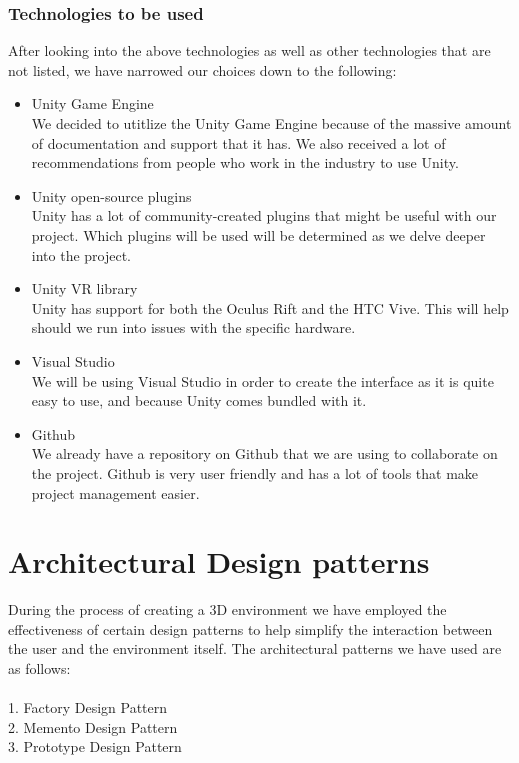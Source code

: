 \documentclass{article}
\begin{document}
	\subsubsection{Technologies to be used}
		After looking into the above technologies as well as other technologies that are not listed, we have narrowed our choices down to the following:
		\begin{itemize}
			\item Unity Game Engine \\
			We decided to utitlize the Unity Game Engine because of the massive amount of documentation and support that it has. We also received a lot of recommendations from people who work in the industry to use Unity.\\

			\item Unity open-source plugins \\
			Unity has a lot of community-created plugins that might be useful with our project. Which plugins will be used will be determined as we delve deeper into the project. \\

			\item Unity VR library \\
			Unity has support for both the Oculus Rift and the HTC Vive. This will help should we run into issues with the specific hardware. \\

			\item Visual Studio \\
			We will be using Visual Studio in order to create the interface as it is quite easy to use, and because Unity comes bundled with it. \\

			\item Github \\
			We already have a repository on Github that we are using to collaborate on the project. Github is very user friendly and has a lot of tools that make project management easier.
		\end{itemize}

\newpage

  \section{Architectural Design patterns}
    During the process of creating a 3D environment we have employed the effectiveness of certain design patterns to help simplify the interaction between the user and the environment itself. The architectural patterns we have used are as follows:\\\\
    1.	Factory Design Pattern\\
    2.	Memento Design Pattern\\
    3.	Prototype Design Pattern\\
\end{document}
